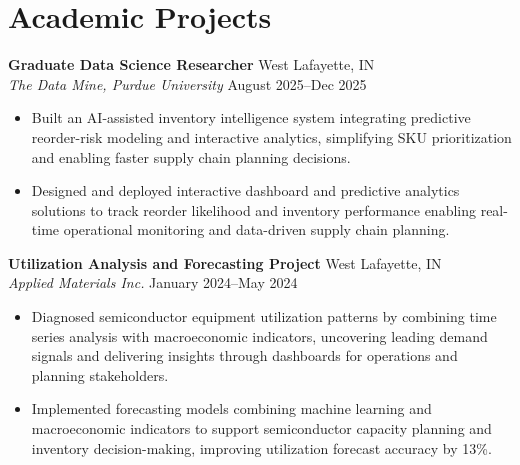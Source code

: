 \documentclass[11pt,a4paper]{article}
\begin{document}
\section*{Academic Projects}  
\noindent
\textbf{Graduate Data Science Researcher} \hfill West Lafayette, IN   \\
\textit{The Data Mine, Purdue University} \hfill August 2025--Dec 2025  
\begin{itemize}[leftmargin=*, noitemsep, topsep=0pt]
    \item Built an AI-assisted inventory intelligence system integrating predictive reorder-risk modeling and interactive analytics, simplifying SKU prioritization and enabling faster supply chain planning decisions.  
    \item Designed and deployed interactive dashboard and predictive analytics solutions to track reorder likelihood and inventory performance enabling real-time operational monitoring and data-driven supply chain planning.  
\end{itemize}
\vspace{6pt}

\noindent
\textbf{Utilization Analysis and Forecasting Project} \hfill West Lafayette, IN   \\
\textit{Applied Materials Inc.} \hfill January 2024--May 2024  
\begin{itemize}[leftmargin=*, noitemsep, topsep=0pt]
    \item Diagnosed semiconductor equipment utilization patterns by combining time series analysis with macroeconomic indicators, uncovering leading demand signals and delivering insights through dashboards for operations and planning stakeholders.  
    \item Implemented forecasting models combining machine learning and macroeconomic indicators to support semiconductor capacity planning and inventory decision-making, improving utilization forecast accuracy by 13\%.  
\end{itemize}
\end{document}
